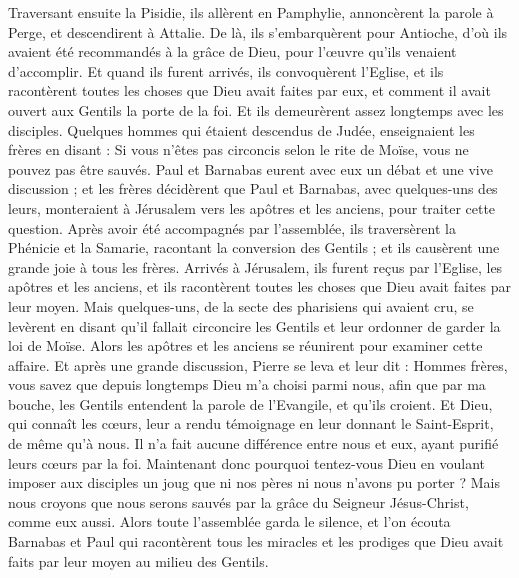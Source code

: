 \begin{multicols}{2}
Traversant ensuite la Pisidie, ils allèrent en Pamphylie,
annoncèrent la parole à Perge, et descendirent à Attalie.
De là, ils s'embarquèrent pour Antioche, d'où ils avaient été recommandés à la grâce de Dieu, pour l'œuvre qu'ils venaient d'accomplir.
Et quand ils furent arrivés, ils convoquèrent l'Eglise, et ils racontèrent toutes les choses que Dieu avait faites par eux, et comment il avait ouvert aux Gentils la porte de la foi.
Et ils demeurèrent assez longtemps avec les disciples.
\VerseOne{}Quelques hommes qui étaient descendus de Judée, enseignaient les frères en disant : Si vous n'êtes pas circoncis selon le rite de Moïse, vous ne pouvez pas être sauvés.
Paul et Barnabas eurent avec eux un débat et une vive discussion ; et les frères décidèrent que Paul et Barnabas, avec quelques-uns des leurs, monteraient à Jérusalem vers les apôtres et les anciens, pour traiter cette question.
Après avoir été accompagnés par l'assemblée, ils traversèrent la Phénicie et la Samarie, racontant la conversion des Gentils ; et ils causèrent une grande joie à tous les frères.
Arrivés à Jérusalem, ils furent reçus par l'Eglise, les apôtres et les anciens, et ils racontèrent toutes les choses que Dieu avait faites par leur moyen.
Mais quelques-uns, de la secte des pharisiens qui avaient cru, se levèrent en disant qu'il fallait circoncire les Gentils et leur ordonner de garder la loi de Moïse.
Alors les apôtres et les anciens se réunirent pour examiner cette affaire.
Et après une grande discussion, Pierre se leva et leur dit : Hommes frères, vous savez que depuis longtemps Dieu m'a choisi parmi nous, afin que par ma bouche, les Gentils entendent la parole de l'Evangile, et qu'ils croient.
Et Dieu, qui connaît les cœurs, leur a rendu témoignage en leur donnant le Saint-Esprit, de même qu'à nous.
Il n'a fait aucune différence entre nous et eux, ayant purifié leurs cœurs par la foi.
Maintenant donc pourquoi tentez-vous Dieu en voulant imposer aux disciples un joug que ni nos pères ni nous n'avons pu porter ?
Mais nous croyons que nous serons sauvés par la grâce du Seigneur Jésus-Christ, comme eux aussi.
Alors toute l'assemblée garda le silence, et l'on écouta Barnabas et Paul qui racontèrent tous les miracles et les prodiges que Dieu avait faits par leur moyen au milieu des Gentils.

\end{multicols}
